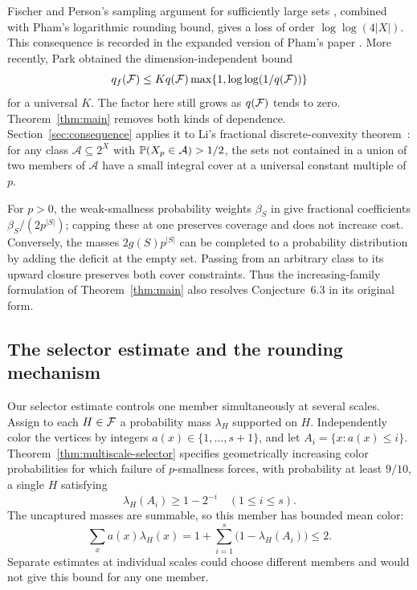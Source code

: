 Fischer and Person's sampling argument for sufficiently large sets
\cite[Theorem~10]{FischerPerson2025}, combined with Pham's logarithmic
rounding bound, gives a loss of order $\log\log(4|X|)$. This consequence
is recorded in the expanded version of Pham's paper
\cite[Corollary~1.8]{Pham2026}. More recently, Park
\cite[Theorem~1.2]{Park2026} obtained the dimension-independent bound
\[
 q_f(\F)\le Kq(\F)\max\{1,\log\log(1/q(\F))\}
\]
for a universal $K$. The factor here still grows as $q(\F)$ tends to
zero. Theorem~\ref{thm:main} removes both kinds of dependence.
Section~\ref{sec:consequence} applies it to Li's fractional
discrete-convexity theorem~\cite{Li2026}: for any class
$\mathcal A\subseteq2^X$ with $\P(X_p\in\mathcal A)>1/2$, the sets
not contained in a union of two members of $\mathcal A$ have a small
integral cover at a universal constant multiple of $p$.

\begin{remark}
For $p>0$, the weak-smallness probability weights $\beta_S$ in
\cite[Definition~6.1]{Talagrand2010} give fractional coefficients
$\beta_S/(2p^{|S|})$; capping these at one preserves coverage and does
not increase cost. Conversely, the masses $2g(S)p^{|S|}$ can be
completed to a probability distribution by adding the deficit at the
empty set. Passing from an arbitrary class to its upward closure
preserves both cover constraints. Thus the increasing-family formulation
of Theorem~\ref{thm:main} also resolves Conjecture~6.3 in its original
form.
\end{remark}

\subsection{The selector estimate and the rounding mechanism}

Our selector estimate controls one member simultaneously at several
scales. Assign to each $H\in\F$ a probability mass $\lambda_H$ supported
on $H$. Independently color the vertices by integers
$a(x)\in\{1,\ldots,s+1\}$, and let
$A_i=\{x:a(x)\le i\}$. Theorem~\ref{thm:multiscale-selector} specifies
geometrically increasing color probabilities for which failure of
$p$-smallness forces, with probability at least $9/10$, a single $H$
satisfying
\[
 \lambda_H(A_i)\ge1-2^{-i}\quad(1\le i\le s).
\]
The uncaptured masses are summable, so this member has bounded mean
color:
\[
 \sum_x a(x)\lambda_H(x)
 =1+\sum_{i=1}^s\bigl(1-\lambda_H(A_i)\bigr)\le2.
\]
Separate estimates at individual scales could choose different members
and would not give this bound for any one member.

